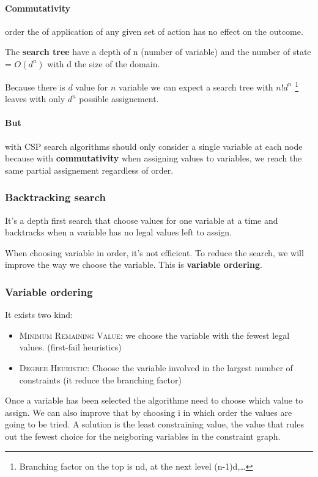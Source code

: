     
\paragraph{Commutativity} order the of application  of any given set of
action has no effect on the outcome.  

The \textbf{search tree} have a depth  of n (number of variable) and the
number of  state =  $O(d^n)$ with  d the  size of  the domain.  

Because there is $d$ value for $n$  variable we can expect a search tree
with $n! d^n$  \footnote{Branching factor on the top is  nd, at the next
level (n-1)d,\ldots} leaves with only $d^n$ possible assignement.

\paragraph{\textbf{But}} with CSP search algorithms should only consider
a single variable at each  node because with \textbf{commutativity} when
assigning values  to variables,  we reach  the same  partial assignement
regardless of order. 


\subsubsection{Backtracking search}  It's a  depth first search  that choose
values for one variable at a time  and backtracks when a variable has no
legal values left  to assign. 

When  choosing variable  in order,  it's  not efficient.  To reduce  the
search,  we  will improve  the  way  we  choose  the variable.  This  is
\textbf{variable ordering}.

\subsubsection{Variable ordering}
It exists two kind:
\begin{itemize}
    \item \textsc{Minimum Remaining Value}: we choose the variable with the fewest legal values. (first-fail heuristics)
    \item \textsc{Degree Heuristic}: Choose the variable involved in the largest number of constraints (it reduce the branching factor)
\end{itemize}

Once a  variable has been selected  the algorithme need to  choose which
value to assign. We  can also improve that by choosing  i in which order
the values are  going to be tried. A solution  is the least constraining
value, the  value that rules  out the  fewest choice for  the neigboring
variables in the constraint graph.


